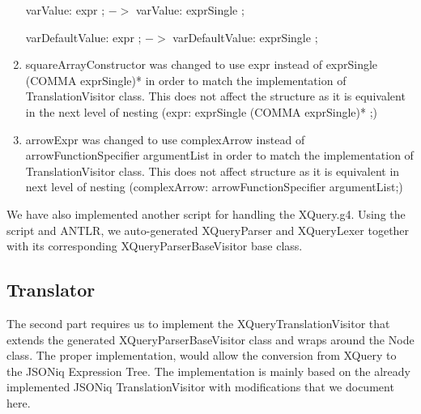 \begin{enumerate}
	varValue: expr ; $->$ varValue: exprSingle ;
	
	varDefaultValue: expr ; $->$ varDefaultValue: exprSingle ;
	
	\item squareArrayConstructor was changed to use expr instead of exprSingle (COMMA exprSingle)* in order to match the implementation of TranslationVisitor class. This does not affect the structure as it is equivalent in the next level of nesting (expr: exprSingle (COMMA exprSingle)* ;)
	
	\item arrowExpr was changed to use complexArrow instead of arrowFunctionSpecifier argumentList in order to match the implementation of TranslationVisitor class. This does not affect structure as it is equivalent in next level of nesting (complexArrow: arrowFunctionSpecifier argumentList;)
\end{enumerate}

We have also implemented another script for handling the XQuery.g4. Using the script and ANTLR, we auto-generated XQueryParser and XQueryLexer together with its corresponding XQueryParserBaseVisitor base class.

\subsection{Translator}
The second part requires us to implement the XQueryTranslationVisitor that extends the generated XQueryParserBaseVisitor class and wraps around the Node class. The proper implementation, would allow the conversion from XQuery to the JSONiq Expression Tree. The implementation is mainly based on the already implemented JSONiq TranslationVisitor with modifications that we document here.

